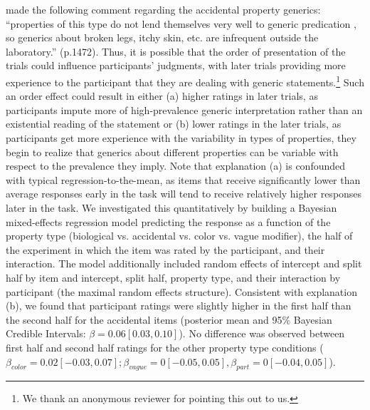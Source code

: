 \documentclass[floatsintext,doc]{apa6}
\let\rmarkdownfootnote\footnote%
\def\footnote{\protect\rmarkdownfootnote}
\begin{document}
  made the following comment regarding the accidental property generics: \enquote{properties of this type do not lend themselves very well to generic predication \cite{gelman1988development, Cimpian2008}, so generics about broken legs, itchy skin, etc. are infrequent outside the laboratory.} (p.1472). Thus, it is possible that the order of presentation of the trials could influence participants' judgments, with later trials providing more experience to the participant that they are dealing with generic statements.\footnote{We thank an anonymous reviewer for pointing this out to us.} Such an order effect could result in either (a) higher ratings in later trials, as participants impute more of high-prevalence generic interpretation rather than an existential reading of the statement or (b) lower ratings in the later trials, as participants get more experience with the variability in types of properties, they begin to realize that generics about different properties can be variable with respect to the prevalence they imply. Note that explanation (a) is confounded with typical regression-to-the-mean, as items that receive significantly lower than average responses early in the task will tend to receive relatively higher responses later in the task. We investigated this quantitatively by building a Bayesian mixed-effects regression model predicting the response as a function of the property type (biological vs. accidental vs. color vs. vague modifier), the half of the experiment in which the item was rated by the participant, and their interaction. The model additionally included random effects of intercept and split half by item and intercept, split half, property type, and their interaction by participant (the maximal random effects structure). Consistent with explanation (b), we found that participant ratings were slightly higher in the first half than the second half for the accidental items (posterior mean and 95\% Bayesian Credible Intervals: $\beta = 0.06 [0.03, 0.10]$). No difference was observed between first half and second half ratings for the other property type conditions ($\beta_{color} = 0.02 [-0.03, 0.07]; \beta_{vague} = 0 [-0.05, 0.05], \beta_{part} = 0 [-0.04, 0.05]$).
 
\end{document}
